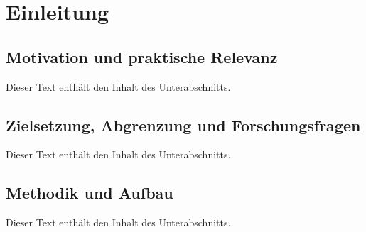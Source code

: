 \section{Einleitung}
\label{sec:01_introduction}

\subsection{Motivation und praktische Relevanz}
\label{subsec:01-01_motivation-and-practical-relevance}

Dieser Text enthält den Inhalt des Unterabschnitts.

\subsection{Zielsetzung, Abgrenzung und Forschungsfragen}
\label{subsec:01-02_objectives-scope-and-research-questions}

Dieser Text enthält den Inhalt des Unterabschnitts.

\subsection{Methodik und Aufbau}
\label{subsec:01-03_methodology-and-structure}

Dieser Text enthält den Inhalt des Unterabschnitts.
